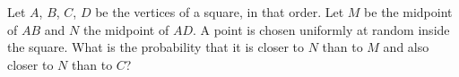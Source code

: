 Let $A$, $B$, $C$, $D$ be the vertices of a square, in that order. Let $M$ be the midpoint of $AB$ and $N$ the midpoint of $AD$. A point is chosen uniformly at random inside the square. What is the probability that it is closer to $N$ than to $M$ and also closer to $N$ than to $C$?
